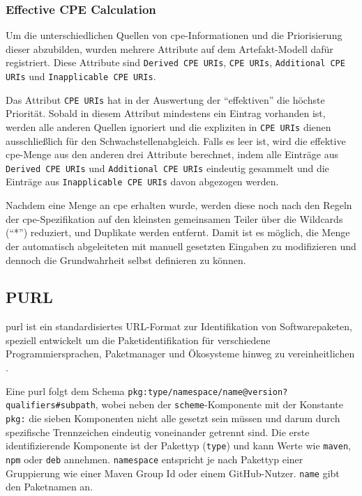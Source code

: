 \subsubsection{Effective CPE Calculation}\label{subsubsec:effective-cpe-calculation}

Um die unterschiedlichen Quellen von \acrshort{cpe}-Informationen und die Priorisierung dieser abzubilden, wurden mehrere Attribute auf dem Artefakt-Modell dafür registriert.
Diese Attribute sind \texttt{Derived CPE URIs}, \texttt{CPE URIs}, \texttt{Additional CPE URIs} und \texttt{Inapplicable CPE URIs}.

Das Attribut \texttt{CPE URIs} hat in der Auswertung der \enquote{effektiven}  die höchste Priorität.
Sobald in diesem Attribut mindestens ein Eintrag vorhanden ist, werden alle anderen Quellen ignoriert und die expliziten  in \texttt{CPE URIs} dienen ausschließlich für den Schwachstellenabgleich.
Falls es leer ist, wird die effektive \acrshort{cpe}-Menge aus den anderen drei Attribute berechnet, indem alle Einträge aus \texttt{Derived CPE URIs} und \texttt{Additional CPE URIs} eindeutig gesammelt und die Einträge aus \texttt{Inapplicable CPE URIs} davon abgezogen werden.

Nachdem eine Menge an \acrshort{cpe} erhalten wurde, werden diese noch nach den Regeln der \acrshort{cpe}-Spezifikation auf den kleinsten gemeinsamen Teiler über die Wildcards (\enquote{*}) reduziert, und Duplikate werden entfernt.
Damit ist es möglich, die Menge der automatisch abgeleiteten  mit manuell gesetzten Eingaben zu modifizieren und dennoch die Grundwahrheit selbst definieren zu können.

\subsection{PURL}

\acrshort{purl} ist ein standardisiertes URL-Format zur Identifikation von Softwarepaketen, speziell entwickelt um die Paketidentifikation für verschiedene Programmiersprachen, Paketmanager und Ökosysteme hinweg zu vereinheitlichen \autocite{PackageURLSpec}.

Eine \acrshort{purl} folgt dem Schema \texttt{pkg:type/namespace/name@version?qualifiers\#subpath}, wobei neben der \texttt{scheme}-Komponente mit der Konstante \texttt{pkg:} die sieben Komponenten nicht alle gesetzt sein müssen und darum durch spezifische Trennzeichen eindeutig voneinander getrennt sind.
Die erste identifizierende Komponente ist der Pakettyp (\texttt{type}) und kann Werte wie \texttt{maven}, \texttt{npm} oder \texttt{deb} annehmen.
\texttt{namespace} entspricht je nach Pakettyp einer Gruppierung wie einer Maven Group Id oder einem GitHub-Nutzer.
\texttt{name} gibt den Paketnamen an.

